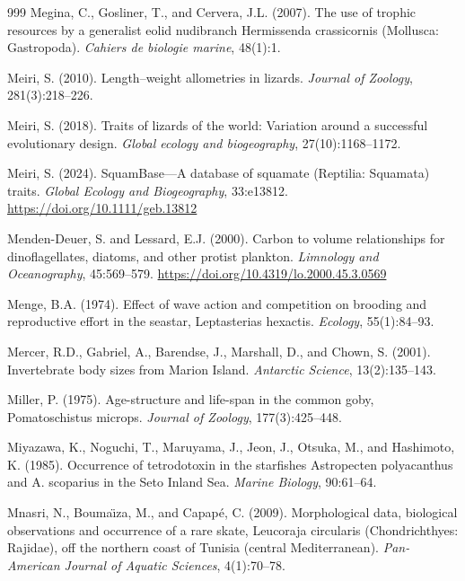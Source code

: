 \begin{thebibliography}{999}
Megina, C., Gosliner, T., and Cervera, J.L. (2007). The use of trophic resources by a generalist eolid nudibranch Hermissenda crassicornis (Mollusca: Gastropoda). \textit{Cahiers de biologie marine}, 48(1):1.

Meiri, S. (2010). Length--weight allometries in lizards. \textit{Journal of Zoology}, 281(3):218--226.

Meiri, S. (2018). Traits of lizards of the world: Variation around a successful evolutionary design. \textit{Global ecology and biogeography}, 27(10):1168--1172.

Meiri, S. (2024). {SquamBase}---A database of squamate ({R}eptilia: {S}quamata) traits. \textit{Global Ecology and Biogeography}, 33:e13812. \url{https://doi.org/10.1111/geb.13812}

Menden-Deuer, S. and Lessard, E.J. (2000). Carbon to volume relationships for dinoflagellates, diatoms, and other protist plankton. \textit{Limnology and Oceanography}, 45:569--579. \url{https://doi.org/10.4319/lo.2000.45.3.0569}

Menge, B.A. (1974). Effect of wave action and competition on brooding and reproductive effort in the seastar, Leptasterias hexactis. \textit{Ecology}, 55(1):84--93.

Mercer, R.D., Gabriel, A., Barendse, J., Marshall, D., and Chown, S. (2001). Invertebrate body sizes from Marion Island. \textit{Antarctic Science}, 13(2):135--143.

Miller, P. (1975). Age-structure and life-span in the common goby, Pomatoschistus microps. \textit{Journal of Zoology}, 177(3):425--448.

Miyazawa, K., Noguchi, T., Maruyama, J., Jeon, J., Otsuka, M., and Hashimoto, K. (1985). Occurrence of tetrodotoxin in the starfishes Astropecten polyacanthus and A. scoparius in the Seto Inland Sea. \textit{Marine Biology}, 90:61--64.

Mnasri, N., Bouma{\"\i}za, M., and Capap{\'e}, C. (2009). Morphological data, biological observations and occurrence of a rare skate, Leucoraja circularis (Chondrichthyes: Rajidae), off the northern coast of Tunisia (central Mediterranean). \textit{Pan-American Journal of Aquatic Sciences}, 4(1):70--78.


\end{thebibliography}
